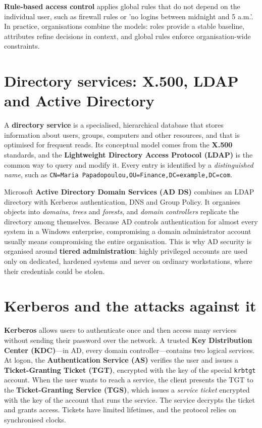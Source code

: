\documentclass[11pt,openany]{book}
\begin{document}
\textbf{Rule-based access control} applies global rules that do not depend on the individual user, such as firewall rules or 'no logins between midnight and 5 a.m.'. In practice, organisations combine the models: roles provide a stable baseline, attributes refine decisions in context, and global rules enforce organisation-wide constraints.

\section{Directory services: X.500, LDAP and Active Directory}\label{sec:8.4}
A \textbf{directory service} is a specialised, hierarchical database that stores information about users, groups, computers and other resources, and that is optimised for frequent reads. Its conceptual model comes from the \textbf{X.500} standards, and the \textbf{Lightweight Directory Access Protocol (LDAP)} is the common way to query and modify it. Every entry is identified by a \emph{distinguished name}, such as \texttt{CN=Maria Papadopoulou,OU=Finance,DC=example,DC=com}.

Microsoft \textbf{Active Directory Domain Services (AD DS)} combines an LDAP directory with Kerberos authentication, DNS and Group Policy. It organises objects into \emph{domains}, \emph{trees} and \emph{forests}, and \emph{domain controllers} replicate the directory among themselves. Because AD controls authentication for almost every system in a Windows enterprise, compromising a domain administrator account usually means compromising the entire organisation. This is why AD security is organised around \textbf{tiered administration}: highly privileged accounts are used only on dedicated, hardened systems and never on ordinary workstations, where their credentials could be stolen.

\section{Kerberos and the attacks against it}\label{sec:8.5}
\textbf{Kerberos} allows users to authenticate once and then access many services without sending their password over the network. A trusted \textbf{Key Distribution Center (KDC)}—in AD, every domain controller—contains two logical services. At logon, the \textbf{Authentication Service (AS)} verifies the user and issues a \textbf{Ticket-Granting Ticket (TGT)}, encrypted with the key of the special \texttt{krbtgt} account. When the user wants to reach a service, the client presents the TGT to the \textbf{Ticket-Granting Service (TGS)}, which issues a \emph{service ticket} encrypted with the key of the account that runs the service. The service decrypts the ticket and grants access. Tickets have limited lifetimes, and the protocol relies on synchronised clocks.
\end{document}
